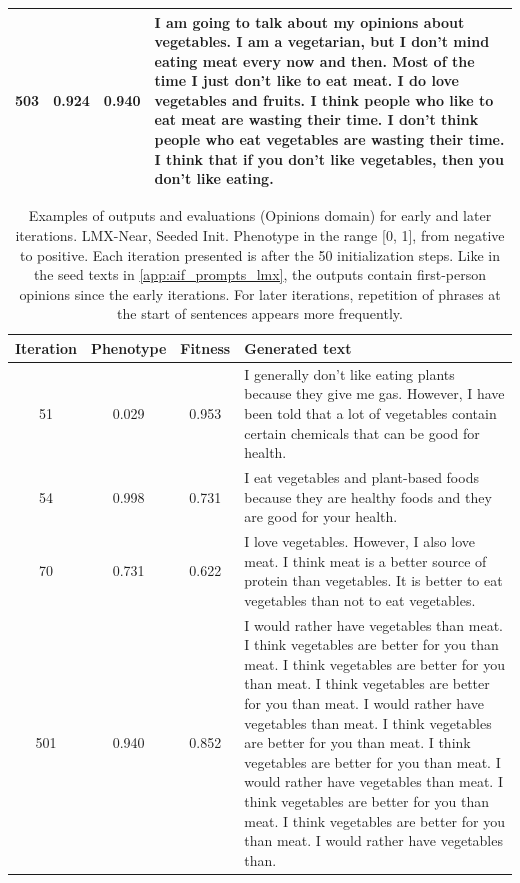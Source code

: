 \begin{table}[ht]
\begin{center}
\begin{tabular}{cccp{8.5cm}}
    \midrule
    503 & 0.924 & 0.940 & I am going to talk about my opinions about vegetables. I am a vegetarian, but I don’t mind eating meat every now and then. Most of the time I just don’t like to eat meat. I do love vegetables and fruits. I think people who like to eat meat are wasting their time. I don’t think people who eat vegetables are wasting their time. I think that if you don’t like vegetables, then you don’t like eating. \\
    \bottomrule
  \end{tabular}
  \end{center}
  \label{app:table_iter_opinions_near_zero}
\end{table}

\begin{table}[ht]
  \caption{Examples of outputs and evaluations (Opinions domain) for early and later iterations. LMX-Near, Seeded Init. Phenotype in the range [0, 1], from negative to positive. Each iteration presented is after the 50 initialization steps. Like in the seed texts in \ref{app:aif_prompts_lmx}, the outputs contain first-person opinions since the early iterations. For later iterations, repetition of phrases at the start of sentences appears more frequently.}
  \begin{center}
  \small
  \begin{tabular}{cccp{8.5cm}}
    \toprule
    Iteration     & Phenotype  & Fitness     & Generated text \\
    \midrule
    51 &  0.029 & 0.953 & I generally don't like eating plants because they give me gas. However, I have been told that a lot of vegetables contain certain chemicals that can be good for health. \\
    \midrule
    54 & 0.998 & 0.731 & I eat vegetables and plant-based foods because they are healthy foods and they are good for your health. \\
    \midrule
    70 & 0.731 & 0.622 & I love vegetables. However, I also love meat. I think meat is a better source of protein than vegetables. It is better to eat vegetables than not to eat vegetables. \\
    \midrule
    \midrule
    501 &  0.940 & 0.852 & I would rather have vegetables than meat. I think vegetables are better for you than meat. I think vegetables are better for you than meat. I think vegetables are better for you than meat. I would rather have vegetables than meat. I think vegetables are better for you than meat. I think vegetables are better for you than meat. I would rather have vegetables than meat. I think vegetables are better for you than meat. I think vegetables are better for you than meat. I would rather have vegetables than. \\

\end{tabular}
\end{center}
\end{table}
